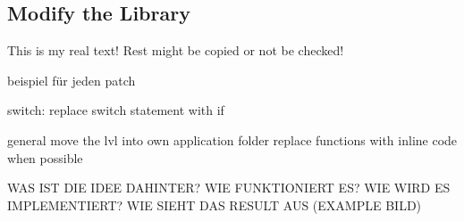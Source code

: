 \subsection{Modify the Library} \label{subsection:counter-modifications-library}
This is my real text! Rest might be copied or not be checked!



beispiel für jeden patch

switch:
replace switch statement with if




general
move the lvl into own application folder
replace functions with inline code when possible

WAS IST DIE IDEE DAHINTER? WIE FUNKTIONIERT ES? WIE WIRD ES IMPLEMENTIERT? WIE SIEHT DAS RESULT AUS (EXAMPLE BILD)\newline
